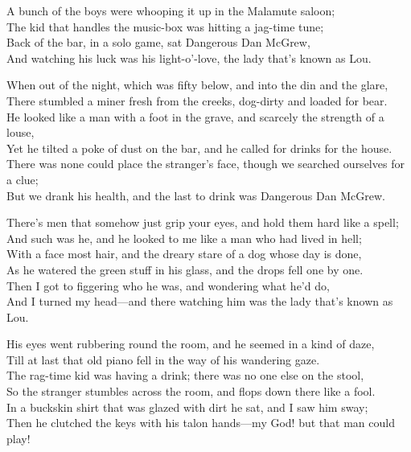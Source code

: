 
\begin{poemblock}
A bunch of the boys were whooping it up in the Malamute saloon;\\
The kid that handles the music-box was hitting a jag-time tune;\\
Back of the bar, in a solo game, sat Dangerous Dan McGrew,\\
And watching his luck was his light-o'-love, the lady that's known as Lou.

When out of the night, which was fifty below, and into the din and the glare,\\
There stumbled a miner fresh from the creeks, dog-dirty and loaded for bear.\\
He looked like a man with a foot in the grave, and scarcely the strength of a louse,\\
Yet he tilted a poke of dust on the bar, and he called for drinks for the house.\\
There was none could place the stranger's face, though we searched ourselves for a clue;\\
But we drank his health, and the last to drink was Dangerous Dan McGrew.

There's men that somehow just grip your eyes, and hold them hard like a spell;\\
And such was he, and he looked to me like a man who had lived in hell;\\
With a face most hair, and the dreary stare of a dog whose day is done,\\
As he watered the green stuff in his glass, and the drops fell one by one.\\
Then I got to figgering who he was, and wondering what he'd do,\\
And I turned my head—and there watching him was the lady that's known as Lou.

His eyes went rubbering round the room, and he seemed in a kind of daze,\\
Till at last that old piano fell in the way of his wandering gaze.\\
The rag-time kid was having a drink; there was no one else on the stool,\\
So the stranger stumbles across the room, and flops down there like a fool.\\
In a buckskin shirt that was glazed with dirt he sat, and I saw him sway;\\
Then he clutched the keys with his talon hands—my God! but that man could play!


\end{poemblock}
